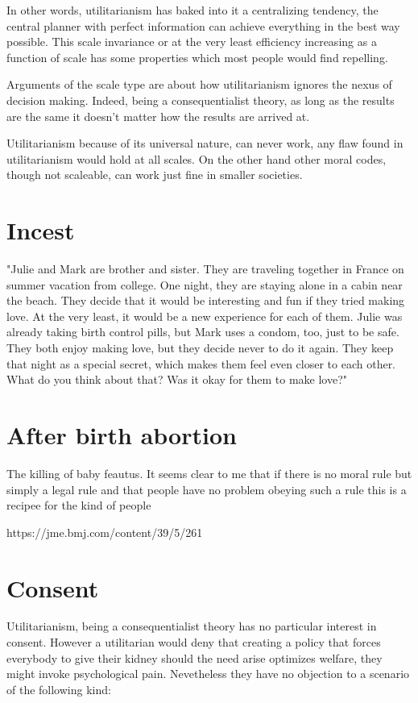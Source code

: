 \documentclass[12pt]{report}
\numberwithin{equation}{section}
\begin{document}
In other words, utilitarianism has baked into it a centralizing tendency, the central planner with perfect information can achieve everything in the best way possible. This scale invariance or at the very least efficiency increasing as a function of scale has some properties which most people would find repelling. 

Arguments of the scale type are about how utilitarianism ignores the nexus of decision making. Indeed, being a consequentialist theory, as long as the results are the same it doesn't matter how the results are arrived at. 

Utilitarianism because of its universal nature, can never work, any flaw found in utilitarianism would hold at all scales. 
On the other hand other moral codes, though not scaleable, can work just fine in smaller societies. 

\section{Incest}

"Julie and Mark are brother and sister. They are traveling together in France on summer vacation from college. One night, they are staying alone in a cabin near the beach. They decide that it would be interesting and fun if they tried making love. At the very least, it would be a new experience for each of them. Julie was already taking birth control pills, but Mark uses a condom, too, just to be safe. They both enjoy making love, but they decide never to do it again. They keep that night as a special secret, which makes them feel even closer to each other. What do you think about that? Was it okay for them to make love?"

\section{After birth abortion}

The killing of baby feautus. It seems clear to me that if there is no moral rule but simply a legal rule and that people have no problem obeying such a rule this is a recipee for the kind of people 

https://jme.bmj.com/content/39/5/261

\section{Consent}

Utilitarianism, being a consequentialist theory has no particular interest in consent. However a utilitarian would deny that creating a policy that forces everybody to give their kidney should the need arise optimizes welfare, they might invoke psychological pain. Nevetheless they have no objection to a scenario of the following kind:
\end{document}
